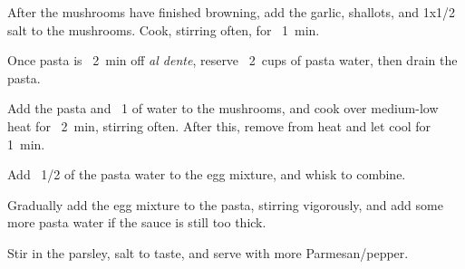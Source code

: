 \begin{recipe}
{		\step After the mushrooms have finished browning, add the garlic, shallots, and \SI{1x1/2}{\teaspoon} salt to the mushrooms. Cook, stirring often, for ~\SI{1}{\minute}.
		
		\step Once pasta is ~\SI{2}{\minute} off \textit{al dente}, reserve ~\SI{2}{cups} of pasta water, then drain the pasta. 
		
		\step Add the pasta and ~\SI{1}{\cup} of water to the mushrooms, and cook over medium-low heat for ~\SI{2}{\minute}, stirring often. After this, remove from heat and let cool for \SI{1}{\minute}.
		
		\step Add ~\SI{1/2}{\cup} of the pasta water to the egg mixture, and whisk to combine. 
		
		\vspace{1em}
		
		\step Gradually add the egg mixture to the pasta, stirring vigorously, and add some more pasta water if the sauce is still too thick. 
		
		\step Stir in the parsley, salt to taste, and serve with more Parmesan/pepper.
	}
    
\end{recipe}